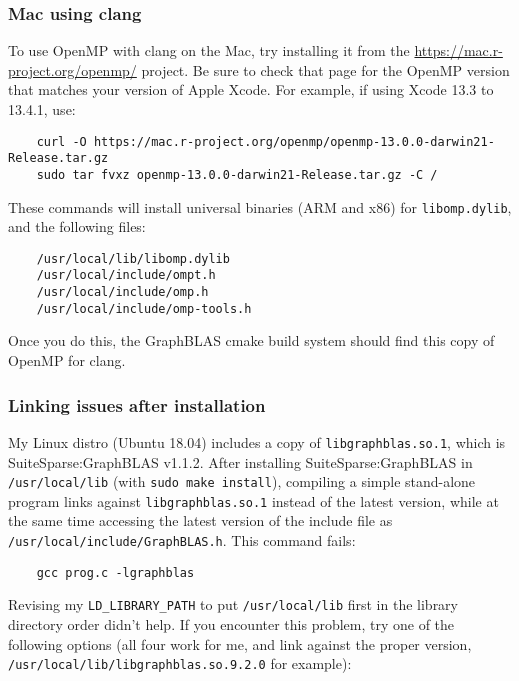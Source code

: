 \documentclass[12pt]{article}
\begin{document}
\subsubsection{Mac using clang}
\label{mac_openmp}

To use OpenMP with clang on the Mac, try installing it from the
    \url{https://mac.r-project.org/openmp/} project.
Be sure to check that page for the OpenMP version
that matches your version of Apple Xcode.
For example, if using Xcode 13.3 to 13.4.1, use:

    {\scriptsize
    \begin{verbatim}
    curl -O https://mac.r-project.org/openmp/openmp-13.0.0-darwin21-Release.tar.gz
    sudo tar fvxz openmp-13.0.0-darwin21-Release.tar.gz -C /
    \end{verbatim} }

These commands will install universal binaries (ARM and x86) for
\verb'libomp.dylib', and the following files:

    {\scriptsize
    \begin{verbatim}
    /usr/local/lib/libomp.dylib
    /usr/local/include/ompt.h
    /usr/local/include/omp.h
    /usr/local/include/omp-tools.h
    \end{verbatim} }

Once you do this, the GraphBLAS cmake build system should find this copy of
OpenMP for clang.

\subsubsection{Linking issues after installation}

My Linux distro (Ubuntu 18.04) includes a copy of \verb'libgraphblas.so.1',
which is SuiteSparse:GraphBLAS v1.1.2.  After installing SuiteSparse:GraphBLAS
in \verb'/usr/local/lib' (with \verb'sudo make install'), compiling a simple
stand-alone program links against \verb'libgraphblas.so.1' instead of the
latest version, while at the same time accessing the latest version of the
include file as \verb'/usr/local/include/GraphBLAS.h'.  This command fails:

    {\small
    \begin{verbatim}
    gcc prog.c -lgraphblas \end{verbatim} }

Revising my \verb'LD_LIBRARY_PATH' to put \verb'/usr/local/lib' first in the
library directory order didn't help.  If you encounter this problem, try one of
the following options (all four work for me, and link against the proper
version, \verb'/usr/local/lib/libgraphblas.so.9.2.0' for example):
\end{document}
